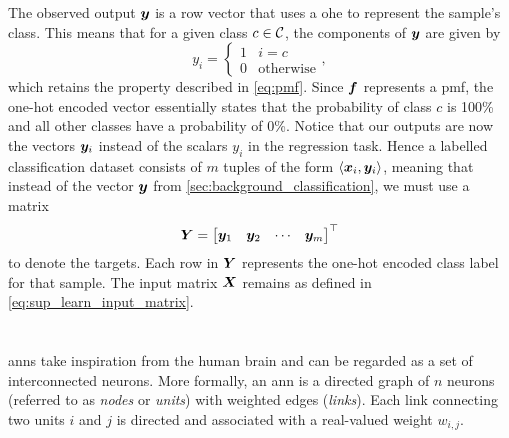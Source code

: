 \documentclass[../report.tex]{subfiles}
\begin{document}
The observed output ${\bm{y}}$ is a row vector that uses a \gls{ohe} to represent the sample's class. 
This means that for a given class $c \in {\mathcal{C}}$, the components of ${\bm{y}}$ are given by
\begin{equation*}
    y_i = \begin{cases}
        1 & i=c \\
        0 & \text{otherwise}
    \end{cases},
\end{equation*}
which retains the property described in \cref{eq:pmf}.
Since ${\bm{f}}$ represents a \gls{pmf}, the one-hot encoded vector essentially states that the probability of class $c$ is 100\% and all other classes have a probability of 0\%.
Notice that our outputs are now the vectors ${\bm{y}}_i$ instead of the scalars $y_i$ in the regression task.
Hence a labelled classification dataset consists of $m$ tuples of the form $\langle {\bm{x}}_i,{\bm{y}}_i \rangle$, meaning that instead of the vector ${\bm{y}}$ from \cref{sec:background_classification}, we must use a matrix
\begin{equation}
    {\bm{Y}} = \begin{bmatrix}
        {\bm{y}}_1 & {\bm{y}}_2 & \cdots & {\bm{y}}_m
    \end{bmatrix}^\top
\end{equation}
to denote the targets.
Each row in ${\bm{Y}}$ represents the one-hot encoded class label for that sample. 
The input matrix ${\bm{X}}$ remains as defined in \cref{eq:sup_learn_input_matrix}.

\section{}
\label{sec:ann}
\Glspl{ann} take inspiration from the human brain and can be regarded as a set of interconnected neurons. 
More formally, an \gls{ann} is a directed graph of $n$ neurons (referred to as \emph{nodes} or \emph{units}) with weighted edges (\emph{links}).
Each link connecting two units $i$ and $j$ is directed and associated with a real-valued weight $w_{i,j}$. 
\end{document}
